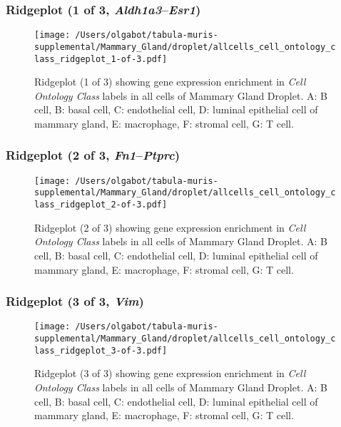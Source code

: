 \clearpage

\subsubsection{Ridgeplot (1 of 3, \emph{Aldh1a3}--\emph{Esr1})}
\begin{figure}[h]
\centering
\texttt{[image: /Users/olgabot/tabula-muris-supplemental/Mammary\_Gland/droplet/allcells\_cell\_ontology\_class\_ridgeplot\_1-of-3.pdf]}

\caption{ Ridgeplot (1 of 3)  showing gene expression enrichment in \emph{Cell Ontology Class} labels in all cells of Mammary Gland Droplet. A: B cell, B: basal cell, C: endothelial cell, D: luminal epithelial cell of mammary gland, E: macrophage, F: stromal cell, G: T cell.}
\end{figure}


\clearpage

\subsubsection{Ridgeplot (2 of 3, \emph{Fn1}--\emph{Ptprc})}
\begin{figure}[h]
\centering
\texttt{[image: /Users/olgabot/tabula-muris-supplemental/Mammary\_Gland/droplet/allcells\_cell\_ontology\_class\_ridgeplot\_2-of-3.pdf]}

\caption{ Ridgeplot (2 of 3)  showing gene expression enrichment in \emph{Cell Ontology Class} labels in all cells of Mammary Gland Droplet. A: B cell, B: basal cell, C: endothelial cell, D: luminal epithelial cell of mammary gland, E: macrophage, F: stromal cell, G: T cell.}
\end{figure}


\clearpage

\subsubsection{Ridgeplot (3 of 3, \emph{Vim})}
\begin{figure}[h]
\centering
\texttt{[image: /Users/olgabot/tabula-muris-supplemental/Mammary\_Gland/droplet/allcells\_cell\_ontology\_class\_ridgeplot\_3-of-3.pdf]}

\caption{ Ridgeplot (3 of 3)  showing gene expression enrichment in \emph{Cell Ontology Class} labels in all cells of Mammary Gland Droplet. A: B cell, B: basal cell, C: endothelial cell, D: luminal epithelial cell of mammary gland, E: macrophage, F: stromal cell, G: T cell.}
\end{figure}


